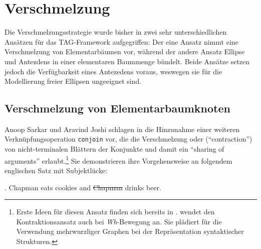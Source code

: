 \section{Verschmelzung}

Die Verschmelzungsstrategie wurde bisher in zwei sehr unterschiedlichen Ansätzen für das TAG-Framework aufgegriffen: Der eine Ansatz nimmt eine Verschmelzung von Elementarbäumen vor, während der andere Ansatz Ellipse und Antezdens in einer elementaren Baummenge bündelt. Beide Ansätze setzen jedoch die Verfügbarkeit eines Antezedens voraus, weswegen sie für die Modellierung freier Ellipsen ungeeignet sind. 

\subsection{Verschmelzung von Elementarbaumknoten}

Anoop Sarkar und Aravind Joshi schlagen in \cite{Sarkar:Joshi:96,Sarkar:Joshi:97} die Hinzunahme einer weiteren Verknüpfungsoperation {\tt conjoin} vor, die die Verschmelzung oder  ("`contraction"') von nicht-terminalen Blättern der Konjunkte und damit ein "`sharing of arguments"' erlaubt.\footnote{Erste Ideen für diesen Ansatz finden sich bereits in \cite{Joshi:Schabes:91}. \cite{Chen-Main:06} wendet den Kontraktionsansatz auch bei \textit{Wh}-Bewegung an. Sie plädiert für die Verwendung mehrwurzliger Graphen bei der Repräsentation syntaktischer Strukturen.} Sie demonstrieren ihre Vorgehensweise an folgendem englischen Satz mit Subjektlücke:

\ex. \label{ex-contraction-1} Chapman eats cookies and \sout{Chapman} drinks beer.\\
\citep[(7)]{Sarkar:Joshi:97}

